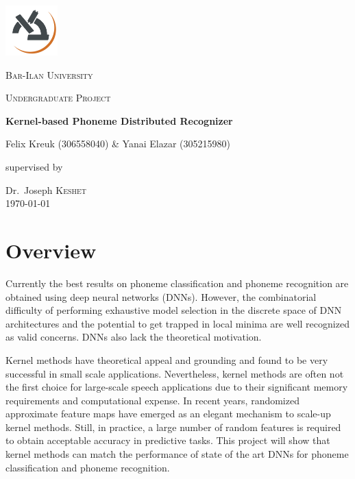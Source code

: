 \documentclass[12pt,a4paper]{article}
\begin{document}
\begin{titlepage}
	\centering
	\includegraphics[width=0.15\textwidth]{biu_logo.png}\par\vspace{1cm}
	{\scshape\LARGE Bar-Ilan University \par}
	\vspace{1cm}
	{\scshape\Large Undergraduate Project\par}
	\vspace{1cm}
	{\huge\bfseries Kernel-based Phoneme Distributed Recognizer\par}
	\vspace{1cm}
	{\Large Felix Kreuk (306558040) \& Yanai Elazar (305215980)\par}
	\vspace{1cm}
	supervised by\par
	Dr.~Joseph \textsc{Keshet}\\
	\vspace{5cm}
{\large \today}
\end{titlepage}

\section{Overview}
Currently the best results on phoneme classification and phoneme recognition are obtained using deep neural networks (DNNs). However, the combinatorial difficulty of performing exhaustive model selection in the discrete space of DNN architectures and the potential to get trapped in local minima are well recognized as valid concerns. DNNs also lack the theoretical motivation.

Kernel methods have theoretical appeal and grounding and found to be very successful in small scale applications. Nevertheless, kernel methods are often not the first choice for large-scale speech applications due to their significant memory requirements and computational expense. In recent years, randomized approximate feature maps have emerged as an elegant mechanism to scale-up kernel methods. Still, in practice, a large number of random features is required to obtain acceptable accuracy in predictive tasks. This project will show that kernel methods can match the performance of state of the art DNNs for phoneme classification and phoneme recognition. 
\end{document}
